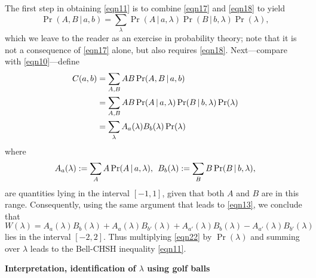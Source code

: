\documentclass[12pt]{article} %
\def\outl#1{\par{\medskip\noindent\hspace*{.5cm}\bf
      \mathversion{bold}#1\mathversion{normal}\smallskip} }
\def\np{} \def\xa{} \def\xb{} \def\xn{} \def\xp{}
\def\outl#1{} \def\np{} \def\xa{} \def\xb{} \def\xn{} \def\xp{}
\def\outl#1{\par{\medskip\noindent\hspace*{.5cm}\bf
      \mathversion{bold}#1\mathversion{normal}\smallskip} }
\def\np{\newpage }\def\xn{\nopagebreak }\def\xp{\pagebreak }
\newcommand{\hquad}{\mspace{8 mu}}
\newcommand{\vb}{\,|\,}
\newcommand{\lm}{\lambda }
\begin{document}
The first step in obtaining \eqref{eqn11} is to combine
\eqref{eqn17} and \eqref{eqn18} to yield
\begin{equation}
  \Pr(A,B\vb a,b) = \sum_\lm \Pr(A\vb a,\lm) \Pr(B\vb b,\lm) \Pr(\lm),
\label{eqn19}
\end{equation}
which we leave to the reader as an exercise in probability theory; note that
it is not a consequence of \eqref{eqn17} alone, but also requires
\eqref{eqn18}.
%
Next---compare with \eqref{eqn10}---define
\begin{align}
C(a,b) &= \sum_{A,B} AB\Pr(A,B\vb a,b)
\notag\\ 
  &= \sum_{A,B} AB\Pr(A\vb a,\lm)\Pr(B\vb b,\lm) \Pr(\lm)
\notag\\
 &= \sum_\lm  A_a(\lm) B_b(\lm) \Pr(\lm)
\label{eqn20}
\end{align}
where
\begin{equation}
  A_a(\lm) := \sum_A A \Pr(A\vb a,\lm),\hquad
  B_b(\lm) := \sum_B B \Pr(B\vb b,\lm),
\label{eqn21}
\end{equation}
are quantities lying in the interval $[-1,1]$, given that both $A$ and $B$ are
in this range. Consequently, using the same
argument that leads to \eqref{eqn13}, we conclude that
\begin{equation}
  W(\lm) = A_a (\lm)B_b(\lm) +A_a (\lm)B_{b'}(\lm) 
    +A_{a'}(\lm) B_b (\lm)-A_{a'}(\lm) B_{b'}(\lm)
\label{eqn22}
\end{equation}
lies in the interval $[-2,2]$. Thus multiplying \eqref{eqn22} by $\Pr(\lm)$
and summing over $\lm$ leads to the Bell-CHSH inequality \eqref{eqn11}.

\xb
\outl{Interpretation, identification of $\lm$ using golf balls}
\xa
  
\end{document}
